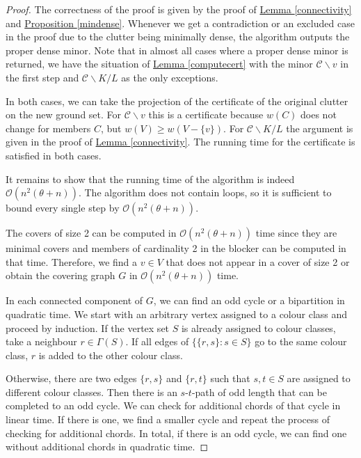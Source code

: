 \documentclass[a4paper, 12pt]{scrbook}
\theoremstyle{definition}
\begin{document}
   \begin{proof}
       The correctness of the proof is given by the proof of \hyperref[connectivity]{Lemma \ref*{connectivity}} and \hyperref[mindense]{Proposition \ref*{mindense}}.
       Whenever we get a contradiction or an excluded case in the proof due to the clutter being minimally dense, the algorithm outputs the proper dense minor.
       Note that in almost all cases where a proper dense minor is returned, we have the situation of \hyperref[computecert]{Lemma \ref*{computecert}} with the minor $\mathcal{C}\backslash v$ in the first step and $\mathcal{C} \backslash K / L$ as the only exceptions.

       In both cases, we can take the projection of the certificate of the original clutter on the new ground set.
       For $\mathcal{C} \backslash v$ this is a certificate because $w(C)$ does not change for members $C$, but $w(V) \geq w(V-\{v\})$.
       For $\mathcal{C} \backslash K / L$ the argument is given in the proof of \hyperref[connectivity]{Lemma \ref*{connectivity}}.
       The running time for the certificate is satisfied in both cases.

       It remains to show that the running time of the algorithm is indeed $\mathcal{O}(n^2(\theta+n))$.
       The algorithm does not contain loops, so it is sufficient to bound every single step by $\mathcal{O}(n^2(\theta+n))$.

       The covers of size 2 can be computed in $\mathcal{O}(n^2(\theta+n))$ time since they are minimal covers and members of cardinality 2 in the blocker can be computed in that time.
       Therefore, we find a $v \in V$ that does not appear in a cover of size 2 or obtain the covering graph $G$ in $\mathcal{O}(n^2(\theta+n))$ time.

       In each connected component of $G$, we can find an odd cycle or a bipartition in quadratic time.
       We start with an arbitrary vertex assigned to a colour class and proceed by induction.
       If the vertex set $S$ is already assigned to colour classes, take a neighbour $r \in \Gamma(S)$.
       If all edges of $\{\{r,s\}:s \in S\}$ go to the same colour class, $r$ is added to the other colour class.

       Otherwise, there are two edges $\{r,s\}$ and $\{r,t\}$ such that $s,t \in S$ are assigned to different colour classes.
       Then there is an $s$-$t$-path of odd length that can be completed to an odd cycle.
       We can check for additional chords of that cycle in linear time.
       If there is one, we find a smaller cycle and repeat the process of checking for additional chords.
       In total, if there is an odd cycle, we can find one without additional chords in quadratic time.


\end{proof}
\end{document}
